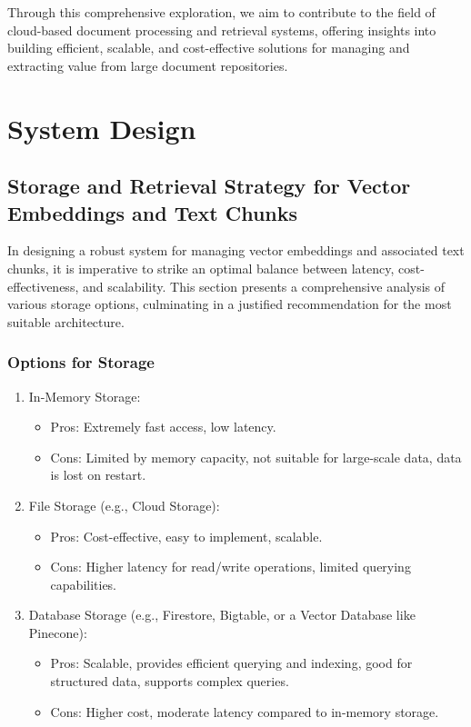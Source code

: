 \documentclass[a4paper, 12pt]{report}
\begin{document}
Through this comprehensive exploration, we aim to contribute to the field of cloud-based document processing and retrieval systems, offering insights into building efficient, scalable, and cost-effective solutions for managing and extracting value from large document repositories.

\chapter{System Design}

\section{Storage and Retrieval Strategy for Vector Embeddings and Text Chunks}
In designing a robust system for managing vector embeddings and associated text chunks, it is imperative to strike an optimal balance between latency, cost-effectiveness, and scalability. This section presents a comprehensive analysis of various storage options, culminating in a justified recommendation for the most suitable architecture.

\subsection{Options for Storage}
\begin{enumerate}
    \item In-Memory Storage:
    \begin{itemize}
        \item Pros: Extremely fast access, low latency.
        \item Cons: Limited by memory capacity, not suitable for large-scale data, data is lost on restart.
    \end{itemize}
    \item File Storage (e.g., Cloud Storage):
    \begin{itemize}
        \item Pros: Cost-effective, easy to implement, scalable.
        \item Cons: Higher latency for read/write operations, limited querying capabilities.
    \end{itemize}
    \item Database Storage (e.g., Firestore, Bigtable, or a Vector Database like Pinecone):
    \begin{itemize}
        \item Pros: Scalable, provides efficient querying and indexing, good for structured data, supports complex queries.
        \item Cons: Higher cost, moderate latency compared to in-memory storage.
    \end{itemize}
\end{enumerate}
\end{document}

